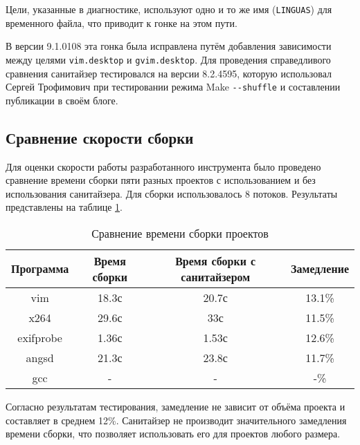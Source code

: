 

Цели, указанные в диагностике, используют одно и то же имя (\texttt{LINGUAS}) для временного файла, что приводит к гонке на этом пути.

В версии 9.1.0108 эта гонка была исправлена путём добавления зависимости между целями \texttt{vim.desktop} и \texttt{gvim.desktop}. Для проведения справедливого сравнения санитайзер тестировался на версии 8.2.4595, которую использовал Сергей Трофимович при тестировании режима Make \texttt{{-}{-}shuffle} и составлении публикации в своём блоге.

\subsection{Сравнение скорости сборки}

Для оценки скорости работы разработанного инструмента было проведено сравнение времени сборки пяти разных проектов с использованием и без использования санитайзера. Для сборки использовалось 8 потоков. Результаты представлены на таблице \ref{tab:build_time}.

\begin{table}[H]
    \centering
    \begin{tabular}{cccc}
        \toprule
        Программа & Время сборки & Время сборки с санитайзером & Замедление \\
        \midrule
        vim & 18.3с & 20.7с & 13.1\% \\
        x264 & 29.6с & 33с & 11.5\% \\
        exifprobe & 1.36с & 1.53с & 12.6\% \\
        angsd & 21.3с & 23.8с & 11.7\% \\
        gcc & - & - & -\% \\
        \bottomrule
    \end{tabular}
    \caption{Сравнение времени сборки проектов}
    \label{tab:build_time}
\end{table}

Согласно результатам тестирования, замедление не зависит от объёма проекта и составляет в среднем 12\%. Санитайзер не производит значительного замедления времени сборки, что позволяет использовать его для проектов любого размера.

